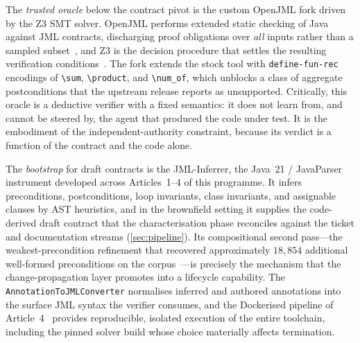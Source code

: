 The \emph{trusted oracle} below the contract pivot is the custom OpenJML fork driven by the Z3 SMT solver. OpenJML performs extended static checking of Java against JML contracts, discharging proof obligations over \emph{all} inputs rather than a sampled subset~\cite{cok2014openjml,cok2011openjml}, and Z3 is the decision procedure that settles the resulting verification conditions~\cite{demoura2008z3}. The fork extends the stock tool with \texttt{define-fun-rec} encodings of \verb|\sum|, \verb|\product|, and \verb|\num_of|, which unblocks a class of aggregate postconditions that the upstream release reports as unsupported. Critically, this oracle is a deductive verifier with a fixed semantics: it does not learn from, and cannot be steered by, the agent that produced the code under test. It is the embodiment of the independent-authority constraint, because its verdict is a function of the contract and the code alone.

The \emph{bootstrap} for draft contracts is the JML-Inferrer, the Java~21 / JavaParser instrument developed across Articles~1--4 of this programme. It infers preconditions, postconditions, loop invariants, class invariants, and assignable clauses by AST heuristics, and in the brownfield setting it supplies the code-derived draft contract that the characterisation phase reconciles against the ticket and documentation streams (\cref{sec:pipeline}). Its compositional second pass---the weakest-precondition refinement that recovered approximately $18{,}854$ additional well-formed preconditions on the corpus~\cite{edmonds_article3}---is precisely the mechanism that the change-propagation layer promotes into a lifecycle capability. The \texttt{AnnotationToJMLConverter} normalises inferred and authored annotations into the surface JML syntax the verifier consumes, and the Dockerised pipeline of Article~4~\cite{edmonds_article4} provides reproducible, isolated execution of the entire toolchain, including the pinned solver build whose choice materially affects termination.

